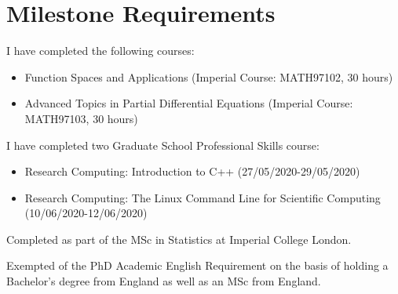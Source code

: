 \documentclass{article}
\theoremstyle{definition}
\theoremstyle{remark}
\theoremstyle{remark}
\begin{document}
\section{Milestone Requirements}


\noindent I have completed the following courses:
\begin{itemize}
    \item Function Spaces and Applications (Imperial Course: MATH97102, 30 hours)
    \item Advanced Topics in Partial Differential Equations (Imperial Course: MATH97103, 30 hours)
\end{itemize}


I have completed two Graduate School Professional Skills course:
\begin{itemize}
    \item Research Computing: Introduction to C++ (27/05/2020-29/05/2020)
    \item Research Computing: The Linux Command Line for Scientific Computing (10/06/2020-12/06/2020)
\end{itemize}


\noindent Completed as part of the MSc in Statistics at Imperial College London.


\noindent Exempted of the PhD Academic English Requirement on the basis of holding a Bachelor's degree from England as well as an MSc from England.

% 
\end{document}
